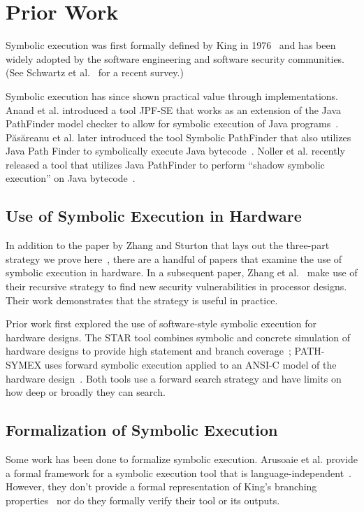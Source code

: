 \section{Prior Work}
Symbolic execution was first formally defined by King in 1976~\cite{king1976symbolic} and has
been widely adopted by the software engineering and software security
communities. (See Schwartz et al.~\cite{schwartz2010all} for a recent survey.)

Symbolic execution has since shown practical value through implementations. Anand et al. introduced a tool JPF-SE that works as an extension of the Java PathFinder model checker to allow for symbolic execution of Java programs~\cite{anand2007jpf}.  P{\u{a}}s{\u{a}}reanu et al. later introduced the tool Symbolic PathFinder that also utilizes Java Path Finder to symbolically execute Java bytecode~\cite{puasuareanu2010symbolic}. Noller et al. recently released a tool that utilizes Java PathFinder to perform ``shadow symbolic execution'' on Java bytecode~\cite{Noller2018}.

\subsection{Use of Symbolic Execution in Hardware}
In addition to the paper by Zhang and Sturton that lays out the three-part
strategy we prove here~\cite{zhang2018recursive}, there are a handful of papers that examine
the use of symbolic execution in hardware. In a subsequent paper, Zhang et
al.~\cite{zhang2018recursive} make use of their recursive strategy to find new security
vulnerabilities in processor designs. Their work demonstrates that the strategy
is useful in practice.

Prior work first explored the use of software-style symbolic execution for hardware designs. The STAR tool combines symbolic and concrete simulation of hardware designs to
provide high statement and branch coverage~\cite{liu2009star}; PATH-SYMEX uses
forward symbolic execution applied to an ANSI-C model of the hardware
design~\cite{mukherjee2015hardware}. Both tools use a forward search strategy
and have limits on how deep or broadly they can search.

\subsection{Formalization of Symbolic Execution}

Some work has been done to formalize symbolic execution. 
Arusoaie et al. provide a formal framework for a symbolic execution tool that is language-independent~\cite{arusoaie2014generic,arusoaie2015symbolic,lucanu2017generic}. 
However, they don't provide a formal representation of King's branching properties~\cite{king1976symbolic} nor do they formally verify their tool or its outputs. 

